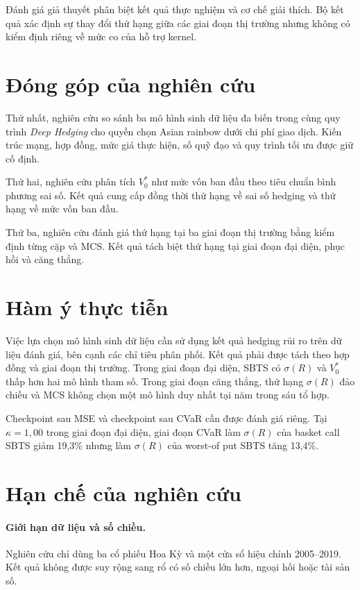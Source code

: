 Đánh giá giả thuyết phân biệt kết quả thực nghiệm và cơ chế giải thích. Bộ kết
quả xác định sự thay đổi thứ hạng giữa các giai đoạn thị trường nhưng không có
kiểm định riêng về mức co của hỗ trợ kernel.

\section{Đóng góp của nghiên cứu}
\label{sec:c5-contributions}

Thứ nhất, nghiên cứu so sánh ba mô hình sinh dữ liệu đa biến trong cùng quy
trình \textit{Deep Hedging} cho quyền chọn Asian rainbow dưới chi phí giao
dịch. Kiến trúc mạng, hợp đồng, mức giá thực hiện, số quỹ đạo và quy trình tối
ưu được giữ cố định.

Thứ hai, nghiên cứu phân tích $V_0^{*}$ như mức vốn ban đầu theo tiêu chuẩn
bình phương sai số. Kết quả cung cấp đồng thời thứ hạng về sai số hedging và
thứ hạng về mức vốn ban đầu.

Thứ ba, nghiên cứu đánh giá thứ hạng tại ba giai đoạn thị trường bằng kiểm định
từng cặp và MCS. Kết quả tách biệt thứ hạng tại giai đoạn đại diện, phục hồi và căng thẳng.

\section{Hàm ý thực tiễn}
\label{sec:c5-implications}

Việc lựa chọn mô hình sinh dữ liệu cần sử dụng kết quả hedging rủi ro trên
dữ liệu đánh giá, bên cạnh các chỉ tiêu phân phối. Kết quả phải được tách theo
hợp đồng và giai đoạn thị trường. Trong giai đoạn đại diện, SBTS có $\sigma(R)$ và
$V_0^{*}$ thấp hơn hai mô hình tham số. Trong giai đoạn căng thẳng, thứ hạng $\sigma(R)$ đảo
chiều và MCS không chọn một mô hình duy nhất tại năm trong sáu tổ hợp.

Checkpoint sau MSE và checkpoint sau CVaR cần được đánh giá riêng. Tại
$\kappa=1{,}00$ trong giai đoạn đại diện, giai đoạn CVaR làm $\sigma(R)$ của basket call
SBTS giảm 19,3\% nhưng làm $\sigma(R)$ của worst-of put SBTS tăng 13,4\%.

\section{Hạn chế của nghiên cứu}
\label{sec:c5-limitations}

\paragraph{Giới hạn dữ liệu và số chiều.}
Nghiên cứu chỉ dùng ba cổ phiếu Hoa Kỳ và một cửa sổ hiệu chỉnh 2005--2019.
Kết quả không được suy rộng sang rổ có số chiều lớn hơn, ngoại hối hoặc tài
sản số.

